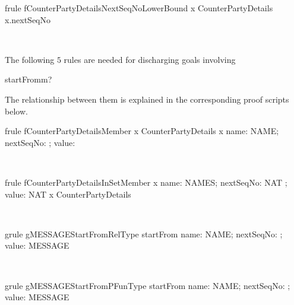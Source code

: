 \begin{LFRT}
\begin{theorem}{frule fCounterPartyDetailsNextSeqNoLowerBound}
   x \in CounterPartyDetails  \leq x.nextSeqNo
\end{theorem}~\end{LFRT}
%
The following $5$ rules are needed for discharging goals involving \begin{gzed} startFrom\inv m? \end{gzed}
The relationship between them is explained in the corresponding proof scripts below.
%
\begin{LFRT}
\begin{theorem}{frule fCounterPartyDetailsMember}
    x \in  CounterPartyDetails \implies  x \in  \lblot name: NAME; nextSeqNo: \nat ; value: \nat \rblot
\end{theorem}~\end{LFRT}

\begin{LFRT}
\begin{theorem}{frule fCounterPartyDetailsInSetMember}
   x \in  \lblot name: NAMES; nextSeqNo: NAT ; value: NAT \rblot  \implies  x \in  CounterPartyDetails
\end{theorem}~\end{LFRT}

\begin{LGRT}
\begin{theorem}{grule gMESSAGEStartFromRelType}
   startFrom \in  \lblot name: NAME; nextSeqNo: \nat ; value: \nat \rblot  \rel  MESSAGE
\end{theorem}~\end{LGRT}

\begin{LGRT}
\begin{theorem}{grule gMESSAGEStartFromPFunType}
   startFrom \in  \lblot name: NAME; nextSeqNo: \nat ; value: \nat \rblot  \pfun  MESSAGE
\end{theorem}~\end{LGRT}

